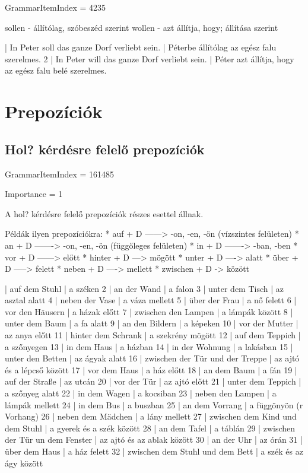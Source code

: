 \documentclass{article}
\newenvironment{desc}{\verbatim}{\endverbatim}
\newenvironment{exmp}{\verbatim}{\endverbatim}
\begin{document}
GrammarItemIndex = 4235

\begin{desc}

sollen - állítólag, szóbeszéd szerint
wollen - azt állítja, hogy; állítása szerint

\end{desc}

\begin{exmp}
1 | In Peter soll das ganze Dorf verliebt sein. | Péterbe állítólag az egész falu szerelmes.
2 | In Peter will das ganze Dorf verliebt sein. | Péter azt állítja, hogy az egész falu belé szerelmes.
\end{exmp}

\section{Prepozíciók}

\subsection{Hol? kérdésre felelő prepozíciók}

GrammarItemIndex = 161485

Importance = 1

\begin{desc}
A hol? kérdésre felelő prepozíciók részes esettel állnak.

Példák ilyen prepozíciókra:
* auf + D ------> -on, -en, -ön (vízszintes felületen)
* an + D -------> -on, -en, -ön (függőleges felületen)
* in + D -------> -ban, -ben
* vor + D ------> előtt
* hinter + D ---> mögött
* unter + D ----> alatt
* über + D -----> felett
* neben + D ----> mellett
* zwischen + D -> között
\end{desc}

\begin{exmp}
1 | auf dem Stuhl | a széken
2 | an der Wand | a falon
3 | unter dem Tisch | az asztal alatt
4 | neben der Vase | a váza mellett
5 | über der Frau | a nő felett
6 | vor den Häusern | a házak előtt
7 | zwischen den Lampen | a lámpák között
8 | unter dem Baum | a fa alatt
9 | an den Bildern | a képeken
10 | vor der Mutter | az anya előtt
11 | hinter dem Schrank | a szekrény mögött
12 | auf dem Teppich | a szőnyegen
13 | in dem Haus | a házban
14 | in der Wohnung | a lakásban
15 | unter den Betten | az ágyak alatt
16 | zwischen der Tür und der Treppe | az ajtó és a lépcső között
17 | vor dem Haus | a ház előtt
18 | an dem Baum | a fán
19 | auf der Straße | az utcán
20 | vor der Tür | az ajtó előtt
21 | unter dem Teppich | a szőnyeg alatt
22 | in dem Wagen | a kocsiban
23 | neben den Lampen | a lámpák mellett
24 | in dem Bus | a buszban
25 | an dem Vorrang | a függönyön (r Vorhang)
26 | neben dem Mädchen | a lány mellett
27 | zwischen dem Kind und dem Stuhl | a gyerek és a szék között
28 | an dem Tafel | a táblán
29 | zwischen der Tür un dem Fenster | az ajtó és az ablak között
30 | an der Uhr | az órán
31 | über dem Haus | a ház felett
32 | zwischen dem Stuhl und dem Bett | a szék és az ágy között
\end{exmp}
\end{document}
